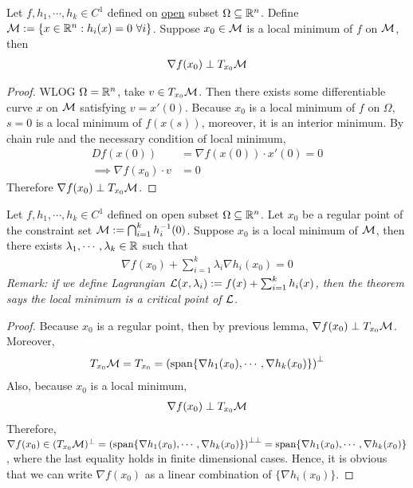 \documentclass{article}
\begin{document}
   	\begin{lemma}
   		Let $f, h_1, \cdots, h_k \in C^1$ defined on \ul{open} subset $\Omega \subseteq \mathbb{R}^n$. Define $\mathcal{{M}} := \{x \in \mathbb{R}^n: h_i(x) = 0\ \forall i \}$. Suppose $x_0 \in \mathcal{{M}}$ is a local minimum of $f$ on $\mathcal{{M}}$, then 
   		\begin{align}
   			\nabla f(x_0) \perp T_{x_0} \mathcal{{M}}
   		\end{align}
   	\end{lemma}
   	
   	\begin{proof}
   		WLOG $\Omega = \mathbb{R}^n$, take $v \in T_{x_0} \mathcal{{M}}$. Then there exists some differentiable curve $x$ on $\mathcal{{M}}$ satisfying $v = x'(0)$. Because $x_0$ is a local minimum of $f$ on $\Omega$, $s=0$ is a local minimum of $f(x(s))$, moreover, it is an interior minimum. By chain rule and the necessary condition of local minimum,
   		\begin{align}
   			D f(x(0)) &= \nabla f (x(0)) \cdot x'(0) = 0 \\
   			\implies \nabla f(x_0) \cdot v &= 0
   		\end{align}
   		Therefore $\nabla f(x_0) \perp T_{x_0} \mathcal{{M}}$.
   	\end{proof}
   	
   	\begin{theorem}
   		Let $f, h_1, \cdots, h_k \in C^1$ defined on open subset $\Omega \subseteq \mathbb{R}^n$. Let $x_0$ be a regular point of the constraint set $\mathcal{{M}} := \bigcap_{i=1}^k h^{-1}_i(0)$. Suppose $x_0$ is a local minimum of $\mathcal{{M}}$, then there exists $\lambda_1, \cdots, \lambda_k \in \mathbb{R}$ such that
   		\begin{align}
   			\nabla f(x_0) + \sum_{i=1}^k \lambda_i \nabla h_i(x_0) = 0
   		\end{align}
   		\emph{Remark: if we define Lagrangian $\mathcal{{L}}(x, \lambda_i) := f(x) + \sum_{i=1}^k h_i(x)$, then the theorem says the local minimum is a critical point of $\mathcal{{L}}$.}
   	\end{theorem}
   	
   	\begin{proof}
   		Because $x_0$ is a regular point, then by previous lemma, $\nabla f(x_0) \perp T_{x_0} \mathcal{{M}}$. Moreover,
   		\begin{align}
   			T_{x_0} \mathcal{{M}} = T_{x_0} = \left (\text{{span}}\{\nabla h_1 (x_0), \cdots, \nabla h_k(x_0)\} \right )^\perp
   		\end{align}
   		Also, because $x_0$ is a local minimum, 
   		\begin{align}
   			\nabla f(x_0) \perp T_{x_0} \mathcal{{M}}
   		\end{align}
   		Therefore, $\nabla f(x_0) \in (T_{x_0} \mathcal{{M}})^\perp = \left (\text{{span}}\{\nabla h_1 (x_0), \cdots, \nabla h_k(x_0)\} \right )^{\perp \perp} = \text{{span}}\{\nabla h_1 (x_0), \cdots, \nabla h_k(x_0)\}$, where the last equality holds in finite dimensional cases. Hence, it is obvious that we can write $\nabla f(x_0)$ as a linear combination of $\{\nabla h_i(x_0)\}$.
   	\end{proof}
   	
\end{document}
